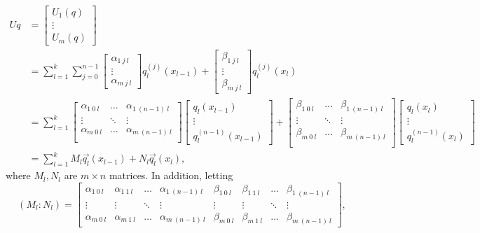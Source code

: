 \documentclass[11pt,reqno,oneside,a4paper]{article}
\theoremstyle{plain} %
\theoremstyle{definition}
\theoremstyle{remark}
\begin{document}
\begin{align*}
Uq &= \begin{bmatrix} U_1(q) \\ \vdots \\U_m(q) \end{bmatrix} \\&= 
\sum^k_{l=1} \sum^{n-1}_{j=0} \begin{bmatrix} \alpha_{1~j~l}  \\ \vdots \\\alpha_{m~j~l}\end{bmatrix}  q_l^{(j)}(x_{l-1}) + \begin{bmatrix} \beta_{1~j~l} \\ \vdots \\\beta_{m~j~l}\end{bmatrix} q_l^{(j)}(x_{l}) \\
&= 
\sum^k_{l=1} 
\begin{bmatrix}
\alpha_{1~0~l}  & \ldots & \alpha_{1~(n-1)~l} \\
\vdots & \ddots & \vdots \\
\alpha_{m~0~l} &  \ldots & \alpha_{m~(n-1)~l} \\
\end{bmatrix}
\begin{bmatrix}
q_l(x_{l-1})  \\
\vdots \\
 q_l^{(n-1)}(x_{l-1})  
\end{bmatrix} + 
\begin{bmatrix}
\beta_{1~0~l} & \ldots & \beta_{1~(n-1)~l} \\
\vdots & \ddots & \vdots \\
\beta_{m~0~l} & \ldots & \beta_{m~(n-1)~l} \\
\end{bmatrix}
\begin{bmatrix}
q_l(x_l)  \\
\vdots \\
 q_l^{(n-1)}(x_l)  
\end{bmatrix} \\
&= \sum^k_{l=1} M_l \vec{q_l}(x_{l-1}) + N_l \vec{q_l}(x_l),
\end{align*}
where $M_l, N_l$ are $m \times n$ matrices. 
In addition, letting 
\[ 
(M_l : N_l) = 
\begin{bmatrix}
\alpha_{1~0~l} & \alpha_{1~1~l} & \ldots & \alpha_{1~(n-1)~l} & \beta_{1~0~l} & \beta_{1~1~l} & \ldots & \beta_{1~(n-1)~l} \\
\vdots & \vdots & \ddots & \vdots & \vdots & \vdots & \ddots & \vdots \\
\alpha_{m~0~l} & \alpha_{m~1~l} & \ldots & \alpha_{m~(n-1)~l} & \beta_{m~0~l} & \beta_{m~1~l} & \ldots & \beta_{m~(n-1)~l}
\end{bmatrix},
\]
\end{document}
